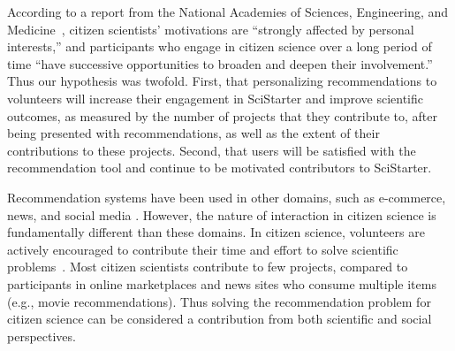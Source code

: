 \documentclass[letterpaper]{article} %
\begin{document}
  According to a report from the National Academies of Sciences, Engineering, and Medicine~\cite{national2018learning}, citizen scientists’ motivations are ``strongly affected by personal interests,” and participants who engage in citizen science over a long period of time ``have successive opportunities to broaden and deepen their involvement.”
 Thus our  hypothesis was  twofold. First, that  
 personalizing recommendations  to volunteers
 will increase their engagement in  SciStarter and improve scientific outcomes,   as measured by 
 the number of projects that they contribute to, after being presented with  recommendations, as well as  the extent of their contributions to these projects.  
 Second, that users will be satisfied with the recommendation tool and continue to be motivated 
 contributors to SciStarter.
  
  
  Recommendation systems have been used in other  domains, such as e-commerce, news, and  social media \cite{itmazi2006recommendation,fleder2007recommender,kleinerman2020supporting}.  However, 
  the nature of interaction in citizen science is fundamentally different  than these domains. In citizen science, 
 volunteers  are actively encouraged to contribute their time and effort to solve scientific problems~\cite{cohn2008citizen}.   
 Most citizen scientists contribute to  few projects, compared to participants in online marketplaces and news sites who consume multiple items (e.g., movie recommendations). 
 Thus solving the recommendation problem for citizen science can be considered a contribution from both scientific and social perspectives. 
 

 
\end{document}
